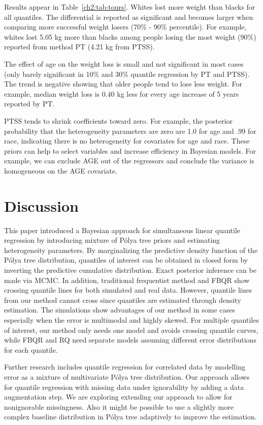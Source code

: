 \documentclass[12pt]{article}
\newcommand{\polya}{P\'{o}lya}
\begin{document}
Results appear in Table~\ref{ch2:tab:tours}.  Whites lost more weight than
blacks for all quantiles.  The differential is reported as significant
and becomes larger when comparing more successful
weight losers (70\% - 90\% percentile). For example, whites lost 5.05
kg more than blacks among people losing the most weight (90\%)
reported from method PT (4.21 kg from PTSS).

The effect of age on the weight loss is small and not significant in
most cases (only barely significant in 10\% and 30\% quantile
regression by PT and PTSS).  The trend is negative showing that older
people tend to lose less weight. For example, median weight loss is
0.40 kg less for every age increase of 5 years reported by PT.

PTSS tends to shrink coefficients toward zero. For example, the
posterior probability that the heterogeneity parameters are zero are
1.0 for age and .99 for race, indicating there is no
heterogeneity for covariates for age and race. These priors can help to select
variables and increase efficiency in Bayesian models. For example, we
can exclude AGE out of the regressors and conclude the variance is
homogeneous on the AGE covariate.


\section{Discussion}
\label{ch2:sec:discussion}
This paper introduced a Bayesian approach for simultaneous linear
quantile regression by introducing mixture of \polya{} tree priors and
estimating heterogeneity parameters. By marginalizing the predictive
density function of the \polya{} tree distribution, quantiles of
interest can be obtained in closed form by inverting the predictive
cumulative distribution. Exact posterior inference can be made via
MCMC. In addition, traditional frequentist method and FBQR show
crossing quantile lines for both simulated and real data.
However, quantile lines from our method cannot cross since
quantiles are estimated through density estimation. The simulations
show advantages of our method in some cases especially when the error
is multimodal and highly skewed.  For multiple quantiles of interest,
our method only needs one model and avoids crossing quantile
curves, while FBQR and RQ need separate models assuming different
error distributions for each quantile.

Further research includes quantile regression for correlated data by
modelling error as a mixture of multivariate \polya{} tree
distribution.  Our approach allows for quantile regression with
missing data under ignorability by adding a data augmentation step.
We are exploring extending our approach to allow for nonignorable
missingness. Also it might be possible to use a slightly more complex
baseline distribution in \polya{} tree adaptively to improve the
estimation.

 
\end{document}
